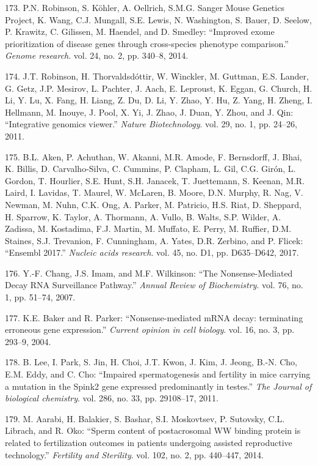 \documentclass[12pt,a4paper,twoside]{ugathesis}
\theoremstyle{definition}
\theoremstyle{definition}
\theoremstyle{definition}
\theoremstyle{remark}
\begin{document}
\hypertarget{ref-Robinson2014}{}
173. P.N. Robinson, S. Köhler, A. Oellrich, S.M.G. Sanger Mouse Genetics
Project, K. Wang, C.J. Mungall, S.E. Lewis, N. Washington, S. Bauer, D.
Seelow, P. Krawitz, C. Gilissen, M. Haendel, and D. Smedley: ``Improved
exome prioritization of disease genes through cross-species phenotype
comparison.'' \emph{Genome research}. vol. 24, no. 2, pp. 340--8, 2014.

\hypertarget{ref-Robinson2011}{}
174. J.T. Robinson, H. Thorvaldsdóttir, W. Winckler, M. Guttman, E.S.
Lander, G. Getz, J.P. Mesirov, L. Pachter, J. Aach, E. Leproust, K.
Eggan, G. Church, H. Li, Y. Lu, X. Fang, H. Liang, Z. Du, D. Li, Y.
Zhao, Y. Hu, Z. Yang, H. Zheng, I. Hellmann, M. Inouye, J. Pool, X. Yi,
J. Zhao, J. Duan, Y. Zhou, and J. Qin: ``Integrative genomics viewer.''
\emph{Nature Biotechnology}. vol. 29, no. 1, pp. 24--26, 2011.

\hypertarget{ref-Aken2017}{}
175. B.L. Aken, P. Achuthan, W. Akanni, M.R. Amode, F. Bernsdorff, J.
Bhai, K. Billis, D. Carvalho-Silva, C. Cummins, P. Clapham, L. Gil, C.G.
Girón, L. Gordon, T. Hourlier, S.E. Hunt, S.H. Janacek, T. Juettemann,
S. Keenan, M.R. Laird, I. Lavidas, T. Maurel, W. McLaren, B. Moore, D.N.
Murphy, R. Nag, V. Newman, M. Nuhn, C.K. Ong, A. Parker, M. Patricio,
H.S. Riat, D. Sheppard, H. Sparrow, K. Taylor, A. Thormann, A. Vullo, B.
Walts, S.P. Wilder, A. Zadissa, M. Kostadima, F.J. Martin, M. Muffato,
E. Perry, M. Ruffier, D.M. Staines, S.J. Trevanion, F. Cunningham, A.
Yates, D.R. Zerbino, and P. Flicek: ``Ensembl 2017.'' \emph{Nucleic
acids research}. vol. 45, no. D1, pp. D635--D642, 2017.

\hypertarget{ref-Chang2007}{}
176. Y.-F. Chang, J.S. Imam, and M.F. Wilkinson: ``The Nonsense-Mediated
Decay RNA Surveillance Pathway.'' \emph{Annual Review of Biochemistry}.
vol. 76, no. 1, pp. 51--74, 2007.

\hypertarget{ref-Baker2004}{}
177. K.E. Baker and R. Parker: ``Nonsense-mediated mRNA decay:
terminating erroneous gene expression.'' \emph{Current opinion in cell
biology}. vol. 16, no. 3, pp. 293--9, 2004.

\hypertarget{ref-Lee2011}{}
178. B. Lee, I. Park, S. Jin, H. Choi, J.T. Kwon, J. Kim, J. Jeong,
B.-N. Cho, E.M. Eddy, and C. Cho: ``Impaired spermatogenesis and
fertility in mice carrying a mutation in the Spink2 gene expressed
predominantly in testes.'' \emph{The Journal of biological chemistry}.
vol. 286, no. 33, pp. 29108--17, 2011.

\hypertarget{ref-Aarabi2014}{}
179. M. Aarabi, H. Balakier, S. Bashar, S.I. Moskovtsev, P. Sutovsky,
C.L. Librach, and R. Oko: ``Sperm content of postacrosomal WW binding
protein is related to fertilization outcomes in patients undergoing
assisted reproductive technology.'' \emph{Fertility and Sterility}. vol.
102, no. 2, pp. 440--447, 2014.
\end{document}
